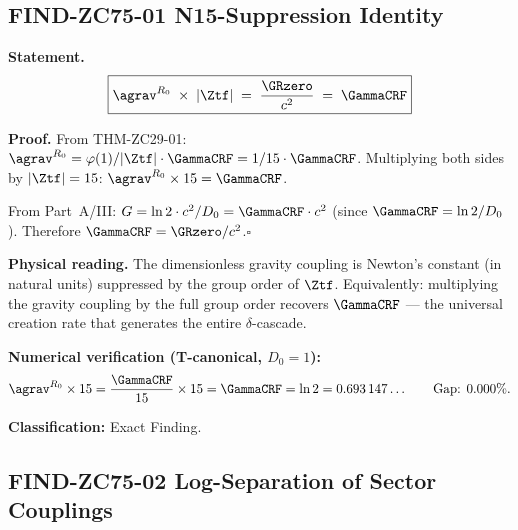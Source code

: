 \documentclass[12pt, a4paper]{article}
\begin{document}
\subsection{FIND-ZC75-01 \quad N15-Suppression Identity}
\label{sec:find01}


\begin{derivedbox}[title={FIND-ZC75-01: N15-Suppression Identity
  ($R_0$, Exact)}]

\textbf{Statement.}
\[
  \boxed{\agrav^{R_0} \;\times\; |\Ztf| \;=\; \frac{\GRzero}{c^2}
  \;=\; \GammaCRF}
\]

\textbf{Proof.}
From THM-ZC29-01: $\agrav^{R_0} = \varphi(1)/|\Ztf| \cdot \GammaCRF
= 1/15 \cdot \GammaCRF$.
Multiplying both sides by $|\Ztf| = 15$:
$\agrav^{R_0} \times 15 = \GammaCRF$.

From Part~A/III: $G = \ln2 \cdot c^2/D_0 = \GammaCRF \cdot c^2$
(since $\GammaCRF = \ln2/D_0$).
Therefore $\GammaCRF = \GRzero/c^2$.\hfill$\square$

\textbf{Physical reading.}
The dimensionless gravity coupling is Newton's constant (in natural
units) suppressed by the group order of $\Ztf$.
Equivalently: multiplying the gravity coupling by the full group
order recovers $\GammaCRF$ --- the universal creation rate that
generates the entire $\delta$-cascade.

\textbf{Numerical verification (T-canonical, $D_0 = 1$):}
\[
  \agrav^{R_0} \times 15
  = \frac{\GammaCRF}{15} \times 15
  = \GammaCRF = \ln 2
  = 0.693\,147\ldots
  \qquad \text{Gap: } 0.000\%.
\]

\textbf{Classification:} Exact Finding.
\end{derivedbox}

\subsection{FIND-ZC75-02 \quad Log-Separation of Sector Couplings}
\label{sec:find02}

\end{document}
